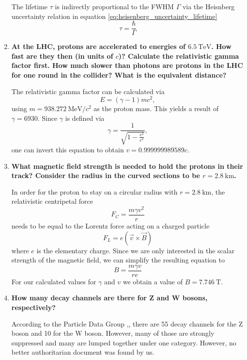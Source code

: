 \documentclass[a4paper,10pt]{article}
\begin{document}
\begin{enumerate}
The lifetime $\tau$ is indirectly proportional to the FWHM $\Gamma$ via the Heisnberg uncertainty relation in equation \ref{eq:heisenberg_uncertainty_lifetime}
\begin{equation}
\label{eq:heisenberg_uncertainty_lifetime}
\tau = \frac{\hbar}{\Gamma}
\end{equation}

\item \textbf{At the LHC, protons are accelerated to energies of $\SI{6.5}{\tera\electronvolt}$. How fast are they then (in units of $c$)? Calculate the relativistic gamma factor first. How much slower than photons are protons in the LHC for one round in the collider? What is the equivalent distance?}

The relativistic gamma factor can be calculated via
\begin{equation}
E = (\gamma -1)mc^2,
\end{equation}
using $m=\SI{938.272}{\mega\eV}/c^2$ as the proton mass. This yields a result of $\gamma = 6930$. Since $\gamma$ is defined via
\begin{equation}
\gamma = \frac{1}{\sqrt{1-\frac{v^2}{c^2}}},
\end{equation}
one can invert this equation to obtain ${v=0.999999989589 c}$.
\item \textbf{What magnetic field strength is needed to hold the protons in their track? Consider the radius in the curved sections to be $r = \SI{2.8}{\kilo\meter}$.}

In order for the proton to stay on a circular radius with $r=\SI{2.8}{\kilo\meter}$, the relativistic centripetal force
\begin{equation}
F_C = \frac{m \gamma v^2}{r}
\end{equation}
needs to be equal to the Lorentz force acting on a charged particle
\[
F_L = e (\vec{v} \times \vec{B})
\]
where $e$ is the elementary charge.
Since we are only interested in the scalar strength of the magnetic field, we can simplify the resulting equation to 
\[
B = \frac{m\gamma v}{r e}
\]
For our calculated values for $\gamma$ and $v$ we obtain a value of $B = \SI{7.746}{\tesla}$.
\item \textbf{How many decay channels are there for Z and W bosons, respectively?}

According to the Particle Data Group \cite{Zchannel},\cite{Wchannel}, there are 55 decay channels for the Z boson and 10 for the W boson. However, many of those are strongly suppressed and many are lumped together under one category. However, no better authoritarian document was found by us.
\end{enumerate}
\end{document}
